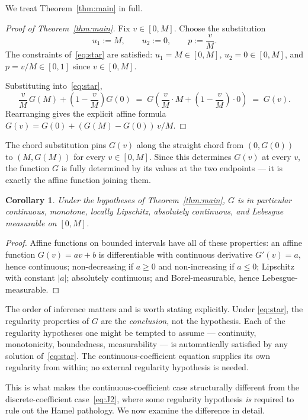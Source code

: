 \documentclass[review,12pt,a4paper]{elsarticle}
\newtheorem{corollary}[theorem]{Corollary}
\theoremstyle{remark}
\begin{document}
We treat Theorem~\ref{thm:main} in full.

\begin{proof}[Proof of Theorem~\ref{thm:main}]
Fix $v\in[0,M]$. Choose the substitution
\[
u_1 := M, \qquad u_2 := 0, \qquad p := \frac{v}{M}.
\]
The constraints of~\eqref{eq:star} are satisfied: $u_1=M\in[0,M]$,
$u_2=0\in[0,M]$, and $p=v/M\in[0,1]$ since $v\in[0,M]$.

Substituting into~\eqref{eq:star},
\[
\frac{v}{M}\,G(M) + \left(1-\frac{v}{M}\right)G(0)
\;=\; G\!\left(\frac{v}{M}\cdot M + \left(1-\frac{v}{M}\right)\cdot 0\right)
\;=\; G(v).
\]
Rearranging gives the explicit affine formula
$G(v)=G(0)+(G(M)-G(0))\,v/M$.
\end{proof}

The chord substitution pins $G(v)$ along the straight chord from
$(0,G(0))$ to $(M,G(M))$ for every $v\in[0,M]$. Since this determines
$G(v)$ at every $v$, the function $G$ is fully determined by its values at
the two endpoints --- it is exactly the affine function joining them.

\begin{corollary}\label{cor:regularity}
Under the hypotheses of Theorem~\ref{thm:main}, $G$ is in particular
continuous, monotone, locally Lipschitz, absolutely continuous, and
Lebesgue measurable on $[0,M]$.
\end{corollary}

\begin{proof}
Affine functions on bounded intervals have all of these properties: an
affine function $G(v)=av+b$ is differentiable with continuous derivative
$G'(v)=a$, hence continuous; non-decreasing if $a\ge0$ and non-increasing
if $a\le0$; Lipschitz with constant $|a|$; absolutely continuous; and
Borel-measurable, hence Lebesgue-measurable.
\end{proof}

The order of inference matters and is worth stating explicitly. Under
\eqref{eq:star}, the regularity properties of $G$ are the
\emph{conclusion}, not the hypothesis. Each of the regularity hypotheses
one might be tempted to assume --- continuity, monotonicity, boundedness,
measurability --- is automatically satisfied by any solution
of~\eqref{eq:star}. The continuous-coefficient equation supplies its own
regularity from within; no external regularity hypothesis is needed.

This is what makes the continuous-coefficient case structurally different
from the discrete-coefficient case~\eqref{eq:J2}, where some regularity
hypothesis \emph{is} required to rule out the Hamel pathology. We now
examine the difference in detail.
\end{document}
